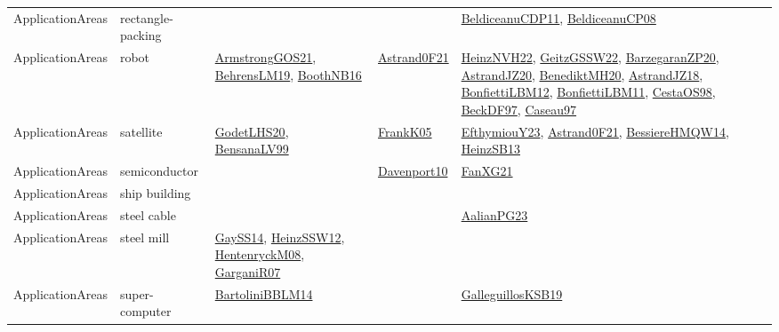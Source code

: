 {\begin{longtable}{lp{3cm}>{\raggedright}p{6cm}>{\raggedright}p{6cm}p{8cm}}
ApplicationAreas & rectangle-packing &  &  & \href{articles/BeldiceanuCDP11.pdf}{BeldiceanuCDP11}\cite{BeldiceanuCDP11}, \href{papers/BeldiceanuCP08.pdf}{BeldiceanuCP08}\cite{BeldiceanuCP08}\\
ApplicationAreas & robot & \href{papers/ArmstrongGOS21.pdf}{ArmstrongGOS21}\cite{ArmstrongGOS21}, \href{papers/BehrensLM19.pdf}{BehrensLM19}\cite{BehrensLM19}, \href{papers/BoothNB16.pdf}{BoothNB16}\cite{BoothNB16} & \href{papers/Astrand0F21.pdf}{Astrand0F21}\cite{Astrand0F21} & \href{articles/HeinzNVH22.pdf}{HeinzNVH22}\cite{HeinzNVH22}, \href{papers/GeitzGSSW22.pdf}{GeitzGSSW22}\cite{GeitzGSSW22}, \href{papers/BarzegaranZP20.pdf}{BarzegaranZP20}\cite{BarzegaranZP20}, \href{articles/AstrandJZ20.pdf}{AstrandJZ20}\cite{AstrandJZ20}, \href{articles/BenediktMH20.pdf}{BenediktMH20}\cite{BenediktMH20}, \href{papers/AstrandJZ18.pdf}{AstrandJZ18}\cite{AstrandJZ18}, \href{papers/BonfiettiLBM12.pdf}{BonfiettiLBM12}\cite{BonfiettiLBM12}, \href{papers/BonfiettiLBM11.pdf}{BonfiettiLBM11}\cite{BonfiettiLBM11}, \href{papers/CestaOS98.pdf}{CestaOS98}\cite{CestaOS98}, \href{papers/BeckDF97.pdf}{BeckDF97}\cite{BeckDF97}, \href{papers/Caseau97.pdf}{Caseau97}\cite{Caseau97}\\
ApplicationAreas & satellite & \href{papers/GodetLHS20.pdf}{GodetLHS20}\cite{GodetLHS20}, \href{articles/BensanaLV99.pdf}{BensanaLV99}\cite{BensanaLV99} & \href{papers/FrankK05.pdf}{FrankK05}\cite{FrankK05} & \href{papers/EfthymiouY23.pdf}{EfthymiouY23}\cite{EfthymiouY23}, \href{papers/Astrand0F21.pdf}{Astrand0F21}\cite{Astrand0F21}, \href{papers/BessiereHMQW14.pdf}{BessiereHMQW14}\cite{BessiereHMQW14}, \href{articles/HeinzSB13.pdf}{HeinzSB13}\cite{HeinzSB13}\\
ApplicationAreas & semiconductor &  & \href{papers/Davenport10.pdf}{Davenport10}\cite{Davenport10} & \href{articles/FanXG21.pdf}{FanXG21}\cite{FanXG21}\\
ApplicationAreas & ship building &  &  & \\
ApplicationAreas & steel cable &  &  & \href{papers/AalianPG23.pdf}{AalianPG23}\cite{AalianPG23}\\
ApplicationAreas & steel mill & \href{papers/GaySS14.pdf}{GaySS14}\cite{GaySS14}, \href{articles/HeinzSSW12.pdf}{HeinzSSW12}\cite{HeinzSSW12}, \href{papers/HentenryckM08.pdf}{HentenryckM08}\cite{HentenryckM08}, \href{papers/GarganiR07.pdf}{GarganiR07}\cite{GarganiR07} &  & \\
ApplicationAreas & super-computer & \href{papers/BartoliniBBLM14.pdf}{BartoliniBBLM14}\cite{BartoliniBBLM14} &  & \href{papers/GalleguillosKSB19.pdf}{GalleguillosKSB19}\cite{GalleguillosKSB19}\\

\end{longtable}}
